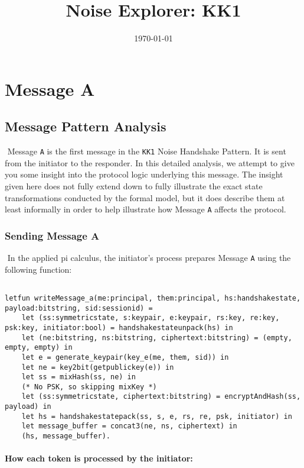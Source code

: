 \title{Noise Explorer: KK1}\date{\today}\maketitle\section{ Message A}

\subsection{Message Pattern Analysis}$ $
Message \texttt{A} is the first message in the \texttt{KK1} Noise Handshake Pattern. It is sent from the initiator to the responder. In this detailed analysis, we attempt to give you some insight into the protocol logic underlying this message. The insight given here does not fully extend down to fully illustrate the exact state transformations conducted by the formal model, but it does describe them at least informally in order to help illustrate how Message \texttt{A} affects the protocol.


\subsubsection{Sending Message A}$ $
In the applied pi calculus, the initiator's process prepares Message \texttt{A} using the following function:


\begin{lstlisting}

letfun writeMessage_a(me:principal, them:principal, hs:handshakestate, payload:bitstring, sid:sessionid) =
	let (ss:symmetricstate, s:keypair, e:keypair, rs:key, re:key, psk:key, initiator:bool) = handshakestateunpack(hs) in
	let (ne:bitstring, ns:bitstring, ciphertext:bitstring) = (empty, empty, empty) in
	let e = generate_keypair(key_e(me, them, sid)) in
	let ne = key2bit(getpublickey(e)) in
	let ss = mixHash(ss, ne) in
	(* No PSK, so skipping mixKey *)
	let (ss:symmetricstate, ciphertext:bitstring) = encryptAndHash(ss, payload) in
	let hs = handshakestatepack(ss, s, e, rs, re, psk, initiator) in
	let message_buffer = concat3(ne, ns, ciphertext) in
	(hs, message_buffer).

\end{lstlisting}

\paragraph{How each token is processed by the initiator:}$ $

